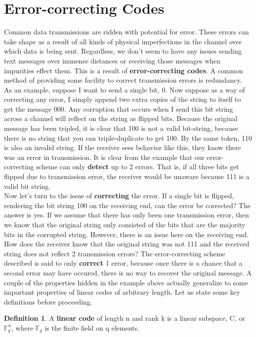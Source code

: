 \documentclass[times,15pt]{article}
\theoremstyle{definition}
\newtheorem{definition}{Definition}[section]
\begin{document}
\section{Error-correcting Codes}
\hspace*{8pt} Common data transmissions are ridden with potential for error.  These errors can take shape as a result of all kinds of physical imperfections in the channel over which data is being sent.  Regardless, we don't seem to have any issues sending text messages over immense distances or receiving those messages when impurities effect them.  This is a result of \textbf{error-correcting codes}.  A common method of providing some facility to correct transmission errors is redundancy.  As an example, suppose I want to send a single bit, 0.  Now suppose as a way of correcting any error, I simply append two extra copies of the string to itself to get the message 000.  Any corruption that occurs when I send this bit string across a channel will reflect on the string as flipped bits.  Because the original message has been tripled, it is clear that 100 is not a valid bit-string, because there is no string that you can triple-duplicate to get 100.  By the same token, 110 is also an invalid string.  If the receiver sees behavior like this, they know there was an error in transmission.  It is clear from the example that our error-correcting scheme can only \textbf{detect} up to 2 errors.  That is, if all three bits get flipped due to transmission error, the receiver would be unaware because 111 is a valid bit string.  \\
\hspace*{8pt} Now let's turn to the issue of \textbf{correcting} the error.  If a single bit is flipped, rendering the bit string 100 on the receiving end, can the error be corrected?  The answer is yes.  If we assume that there has only been one transmission error, then we know that the original string only consisted of the bits that are the majority bits in the corrupted string.  However, there is an issue here on the receiving end.  How does the receiver know that the original string was not 111 and the received string does not reflect 2 transmission errors?  The error-correcting scheme described is said to only \textbf{correct} 1 error, because once there is a chance that a second error may have occured, there is no way to recover the original message. 
\hspace*{8pt} A couple of the properties hidden in the example above actually generalize to some important properties of linear codes of arbitrary length.  Let us state some key definitions before proceeding.        

\begin{definition}
A \textbf{linear code} of length n and rank k is a linear subspace, C, or $\mathbb{F}_{q}^{n}$, where $\mathbb{F}_{q}$ is the finite field on q elements. 
\end{definition}	
\end{document}
